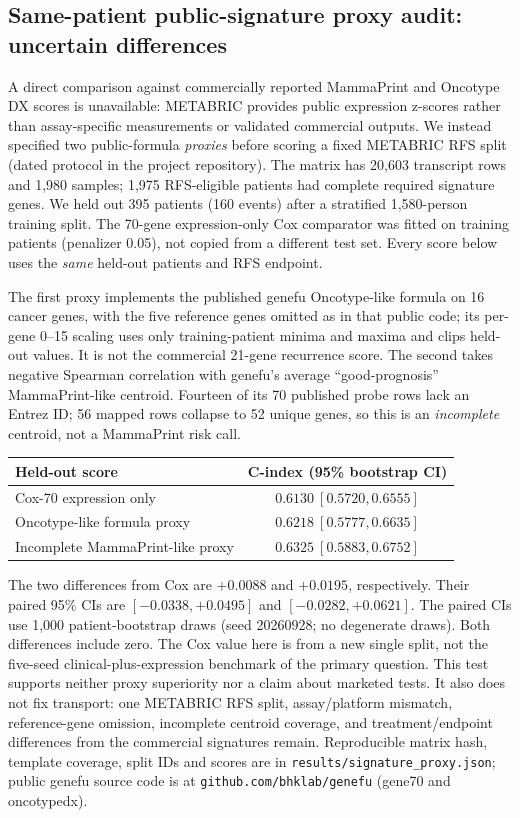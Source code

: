 \documentclass[12pt,a4paper]{article}
\begin{document}
\subsection{Same-patient public-signature proxy audit: uncertain differences}
A direct comparison against commercially reported MammaPrint and Oncotype DX
scores is unavailable: METABRIC provides public expression z-scores rather
than assay-specific measurements or validated commercial outputs. We instead
specified two public-formula \emph{proxies} before scoring a fixed METABRIC RFS split (dated protocol in the project repository).
The matrix has 20,603 transcript rows and 1,980 samples;
1,975 RFS-eligible patients had complete required signature genes. We held
out 395 patients (160 events) after a stratified 1,580-person training split.
The 70-gene expression-only Cox comparator was fitted on training patients
(penalizer 0.05), not copied from a different test set. Every score below
uses the \emph{same} held-out patients and RFS endpoint.

The first proxy implements the published genefu Oncotype-like formula on 16
cancer genes, with the five reference genes omitted as in that public code;
its per-gene 0--15 scaling uses only training-patient minima and maxima and
clips held-out values. It is not the commercial 21-gene recurrence score.
The second takes negative Spearman correlation with genefu's average
``good-prognosis'' MammaPrint-like centroid. Fourteen of its 70 published
probe rows lack an Entrez ID; 56 mapped rows collapse to 52 unique genes,
so this is an \emph{incomplete} centroid, not a MammaPrint risk call.
\begin{center}
\begin{tabular}{lc}
Held-out score & C-index (95\% bootstrap CI)\\
\hline
Cox-70 expression only & $0.6130\ [0.5720,0.6555]$\\
Oncotype-like formula proxy & $0.6218\ [0.5777,0.6635]$\\
Incomplete MammaPrint-like proxy & $0.6325\ [0.5883,0.6752]$\\
\end{tabular}
\end{center}
The two differences from Cox are $+0.0088$ and $+0.0195$, respectively.
Their paired 95\% CIs are $[-0.0338,+0.0495]$ and $[-0.0282,+0.0621]$.
The paired CIs use 1,000 patient-bootstrap draws (seed 20260928; no
degenerate draws). Both differences include zero. The Cox value here is
from a new single split, not the five-seed clinical-plus-expression benchmark
of the primary question. This test supports neither proxy superiority nor a
claim about marketed tests. It also does not fix transport: one METABRIC RFS
split, assay/platform mismatch, reference-gene omission, incomplete centroid
coverage, and treatment/endpoint differences from the commercial signatures
remain. Reproducible matrix hash, template coverage, split IDs and scores are
in \texttt{results/signature\_proxy.json}; public genefu source code is at
\texttt{github.com/bhklab/genefu} (gene70 and oncotypedx).
\end{document}
